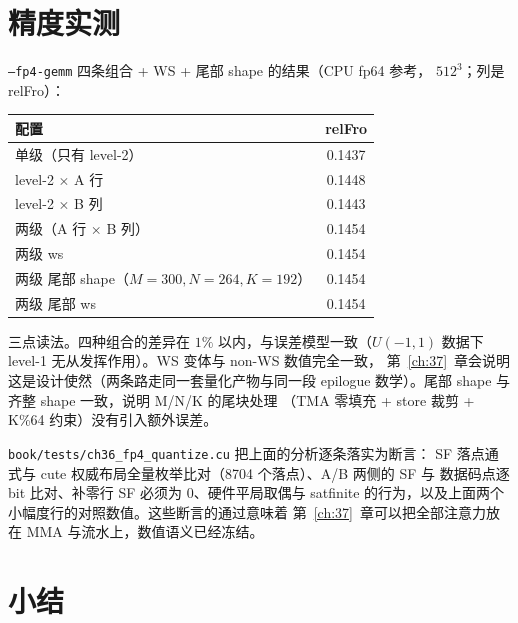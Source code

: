 \section{精度实测}

\texttt{--fp4-gemm} 四条组合 + WS + 尾部 shape 的结果（CPU fp64 参考，
$512^3$；列是 relFro）：

\begin{center}
\footnotesize
\begin{tabular}{lc}
\toprule
配置 & relFro \\
\midrule
单级（只有 level-2） & 0.1437 \\
level-2 $\times$ A 行 & 0.1448 \\
level-2 $\times$ B 列 & 0.1443 \\
两级（A 行 $\times$ B 列） & 0.1454 \\
两级 ws & 0.1454 \\
两级 尾部 shape（$M{=}300,N{=}264,K{=}192$） & 0.1454 \\
两级 尾部 ws & 0.1454 \\
\bottomrule
\end{tabular}
\end{center}

三点读法。四种组合的差异在 $1\%$ 以内，与误差模型一致（$U(-1,1)$ 数据下
level-1 无从发挥作用）。WS 变体与 non-WS 数值完全一致，
第~\ref{ch:37}~章会说明这是设计使然（两条路走同一套量化产物与同一段
epilogue 数学）。尾部 shape 与齐整 shape 一致，说明 M/N/K 的尾块处理
（TMA 零填充 + store 裁剪 + K\%64 约束）没有引入额外误差。

\texttt{book/\allowbreak tests/\allowbreak ch36\_fp4\_quantize.cu} 把上面的分析逐条落实为断言：
SF 落点通式与 cute 权威布局全量枚举比对（8704 个落点）、A/B 两侧的 SF 与
数据码点逐 bit 比对、补零行 SF 必须为 0、硬件平局取偶与 satfinite
的行为，以及上面两个小幅度行的对照数值。这些断言的通过意味着
第~\ref{ch:37}~章可以把全部注意力放在 MMA 与流水上，数值语义已经冻结。

\section{小结}

